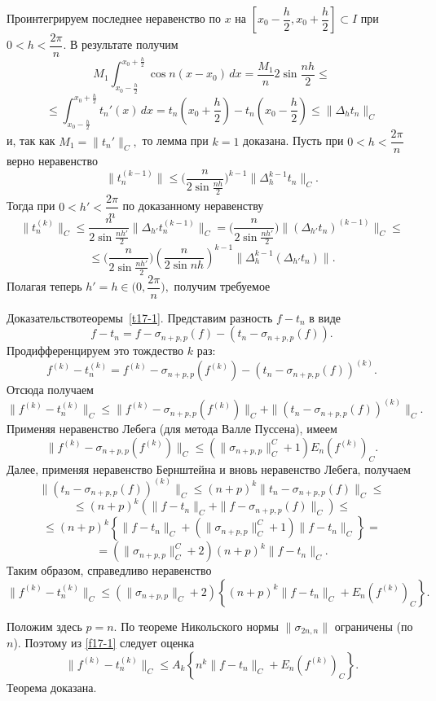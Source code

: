  Проинтегрируем последнее неравенство по $x$ на
 $ \left[ x_0-\dfrac{h}{2},x_0+\dfrac{h}{2} \right]\subset I$
 при $0<h<\dfrac{2\pi}{n}.$ В результате получим
 $$
 M_1 \int_{x_0-\frac{h}{2}}^{x_0+\frac{h}{2}}\cos n(x-x_0)\, dx=
 \frac{M_1}{n} 2\sin \frac{nh}{2}\le
 $$
 $$
 \le \int_{x_0-\frac{h}{2}}^{x_0+\frac{h}{2}} t_n'(x)\, dx=
 t_n\left(x_0+\frac{h}{2}\right)- t_n\left(x_0-\frac{h}{2}\right)\le
 \|\Delta_ht_n\|_C
 $$
 и, так как $M_1=\|t_n'\|_C,$ то лемма при $k=1$ доказана.
 Пусть при $0<h<\dfrac{2\pi}{n}$ верно неравенство
 $$
 \|t_n^{(k-1)}\|\le \bigg( \dfrac{n}{2\sin\frac{nh}{2}}\bigg)^{k-1}\|\Delta_h^{k-1}
 t_n\|_C.
 $$
 Тогда при $0<h'<\dfrac{2\pi}{n}$ по доказанному
 неравенству
 $$\|t_n^{(k)}\|_C\le \dfrac{n}{2\sin\frac{nh'}{2}}\|\Delta_{h'} t_n^{(k-1)}\|_C=
\bigg(
\dfrac{n}{2\sin\frac{nh'}{2}}\bigg)\|(\Delta_{h'}
t_n)^{(k-1)}\|_C\le
$$
$$
\le \bigg( \dfrac{n}{2\sin\frac{nh'}{2}}\bigg)
\left( \dfrac{n}{2\sin nh}\right)^{k-1}\|\Delta_h^{k-1}(\Delta_{h'} t_n)\|.
$$
Полагая теперь $h'=h\in \Big(0,\dfrac{2\pi}{n}\Big),$
получим требуемое

 Д\;о\;к\;а\;з\;а\;т\;е\;л\;ь\;с\;т\;в\;о\quad теоремы~\ref{t17-1}.
 Представим разность $f-t_n$ в виде
 $$
 f-t_n=f-\sigma_{n+p,p}(f)-(t_n-\sigma_{n+p,p}(f)).
 $$
 Продифференцируем это тождество $k$ раз:
 $$
 f^{(k)}-t_n^{(k)}=f^{(k)}-\sigma_{n+p,p}(f^{(k)})-(t_n-
 \sigma_{n+p,p}(f))^{(k)}.
 $$
Отсюда получаем
 $$
 \|f^{(k)}-t_n^{(k)}\|_C\le \|f^{(k)}-\sigma_{n+p,p}(f^{(k)})\|_C+\|(t_n-
 \sigma_{n+p,p}(f))^{(k)}\|_C.
 $$
 Применяя неравенство Лебега  (для метода Валле Пуссена), имеем
 $$
 \|f^{(k)}-\sigma_{n+p,p}(f^{(k)})\|_C\le
 ({\|\sigma_{n+p,p}\|_C^C}+1) E_n(f^{(k)})_C.
 $$
 Далее, применяя неравенство Бернштейна и вновь неравенство  Лебега, получаем
 $$
 \|(t_n-
 \sigma_{n+p,p}(f))^{(k)}\|_C\le (n+p)^k \|t_n-
 \sigma_{n+p,p}(f)\|_C\le
 $$
 $$
 \le
  (n+p)^k (\|f-t_n\|_C+\|f-
 \sigma_{n+p,p}(f)\|_C)
 \le
 $$
 $$
 \le (n+p)^k \left\{
 \|f-t_n\|_C+({\|\sigma_{n+p,p}\|_C^C}+1)\|f-t_n\|_C\right\} =
 $$
 $$
 =({\|\sigma_{n+p,p}\|_C^C}+2)  (n+p)^k
 \|f-t_n\|_C.
 $$
 Таким образом,  справедливо неравенство
 \begin{equation}\label{f17-1}
 \|f^{(k)}-t_n^{(k)}\|_C\le (\|\sigma_{n+p,p}\|_C+2) \left\{ (n+p)^k
 \|f-t_n\|_C+E_n(f^{(k)})_C\right\}. %
 \end{equation}

 Положим здесь $p=n.$ По  теореме Никольского нормы $\|\sigma_{2n,n}\|$
 ограничены (по $n$). Поэтому  из {\eqref{f17-1}} следует оценка
 $$
 \|f^{(k)}-t_n^{(k)}\|_C\le A_k \left\{ n^k \|f-t_n\|_C+E_n
 (f^{(k)})_{{C}}\right\}.
 $$
 Теорема доказана.


